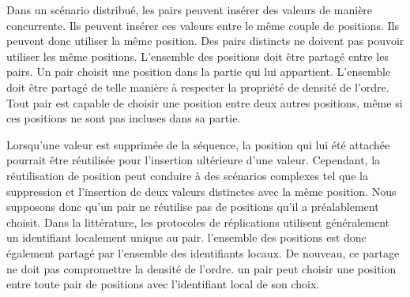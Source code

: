 Dans un scénario distribué, les pairs peuvent insérer des valeurs de manière concurrente.
Ils peuvent insérer ces valeurs entre le même couple de positions.
Ils peuvent donc utiliser la même position.
Des pairs distincts ne doivent pas pouvoir utiliser les même positions.
L'ensemble des positions doit être partagé entre les pairs.
Un pair choisit une position dans la partie qui lui appartient.
L'ensemble doit être partagé de telle manière à respecter la propriété de densité de l'ordre.
Tout pair est capable de choisir une position entre deux autres positions, même si ces positions ne sont pas incluses dans sa partie.

Lorsqu'une valeur est supprimée de la séquence, la position qui lui été attachée pourrait être réutilisée pour l'insertion ultérieure d'une valeur.
Cependant, la réutilisation de position peut conduire à des scénarios complexes tel que la suppression et l'insertion de deux valeurs distinctes avec la même position.
Nous supposons donc qu'un pair ne réutilise pas de positions qu'il a préalablement choisit.
Dans la littérature, les protocoles de réplications utilisent généralement un identifiant localement unique au pair.
l'ensemble des positions est donc également partagé par l'ensemble des identifiants locaux.
De nouveau, ce partage ne doit pas compromettre la densité de l'ordre.
un pair peut choisir une position entre toute pair de positions avec l'identifiant local de son choix.

